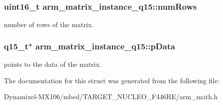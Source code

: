 \subsubsection[{\texorpdfstring{num\+Rows}{numRows}}]{\setlength{\rightskip}{0pt plus 5cm}uint16\+\_\+t arm\+\_\+matrix\+\_\+instance\+\_\+q15\+::num\+Rows}\hypertarget{structarm__matrix__instance__q15_a9bac6ed54be287c4d4f01a1a28be65f5}{}\label{structarm__matrix__instance__q15_a9bac6ed54be287c4d4f01a1a28be65f5}
number of rows of the matrix. 
\subsubsection[{\texorpdfstring{p\+Data}{pData}}]{\setlength{\rightskip}{0pt plus 5cm}q15\+\_\+t$\ast$ arm\+\_\+matrix\+\_\+instance\+\_\+q15\+::p\+Data}\hypertarget{structarm__matrix__instance__q15_a6da33a5553e634787d0f515cf8d724af}{}\label{structarm__matrix__instance__q15_a6da33a5553e634787d0f515cf8d724af}
points to the data of the matrix. 

The documentation for this struct was generated from the following file\+:\begin{DoxyCompactItemize}
\item 
Dynamixel-\/\+M\+X106/mbed/\+T\+A\+R\+G\+E\+T\+\_\+\+N\+U\+C\+L\+E\+O\+\_\+\+F446\+R\+E/arm\+\_\+math.\+h\end{DoxyCompactItemize}
